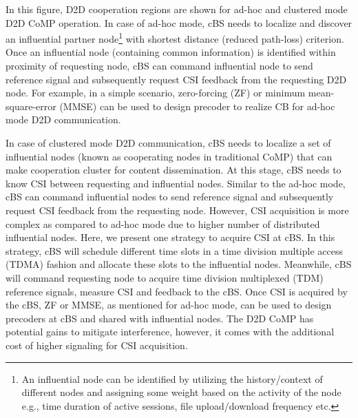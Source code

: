 \documentclass[article,10pt,twocolumn]{IEEEtran}
\begin{document}
In this figure, D2D cooperation regions are shown for ad-hoc and clustered mode D2D CoMP operation. In case of ad-hoc mode, cBS needs to localize and discover an influential partner node\footnote{An influential node can be identified by utilizing the history/context of different nodes and assigning some weight based on the activity of the node e.g., time duration of active sessions, file upload/download frequency etc.} with shortest distance (reduced path-loss) criterion. Once an influential node (containing common information) is identified within proximity of requesting node, cBS can command influential node to send reference signal and subsequently request CSI feedback from the requesting D2D node. For example, in a simple scenario, zero-forcing (ZF) or minimum mean-square-error (MMSE) \citep{6849319} can be used to design precoder to realize CB for ad-hoc mode D2D communication.
 
In case of clustered mode D2D communication, cBS needs to localize a set of influential nodes (known as cooperating nodes in traditional CoMP) that can make cooperation cluster for content dissemination. At this stage, cBS needs to know CSI between requesting and influential nodes. Similar to the ad-hoc mode, cBS can command influential nodes to send reference signal and subsequently request CSI feedback from the requesting node. However, CSI acquisition is more complex as compared to ad-hoc mode due to higher number of distributed influential nodes. Here, we present one strategy to acquire CSI at cBS. In this strategy, cBS will schedule different time slots in a time division multiple access (TDMA) fashion and allocate these slots to the influential nodes. Meanwhile, cBS will command requesting node to acquire time division multiplexed (TDM) reference signals, measure CSI and feedback to the cBS. Once CSI is acquired by the cBS, ZF or MMSE, as mentioned for ad-hoc mode, can be used to design precoders at cBS and shared with influential nodes. The D2D CoMP has potential gains to mitigate interference, however, it comes with the additional cost of higher signaling for CSI acquisition.
\end{document}
